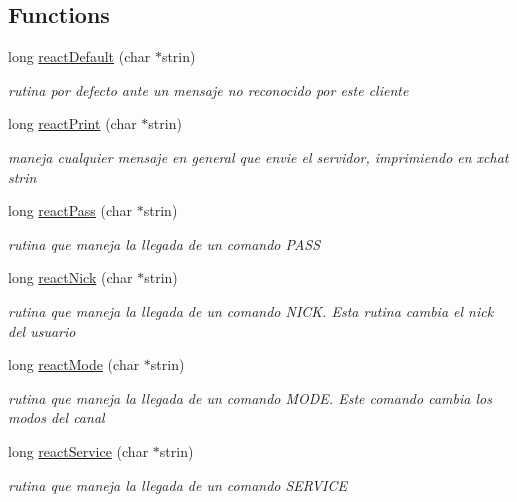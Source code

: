\subsection*{Functions}
\begin{DoxyCompactItemize}
\item 
long \hyperlink{_g-2301-05-_p2-basic_commands_from_server_8c_a4a541fbbe2af9ced94c42bd9035763e0}{react\-Default} (char $\ast$strin)
\begin{DoxyCompactList}\small\item\em rutina por defecto ante un mensaje no reconocido por este cliente \end{DoxyCompactList}\item 
long \hyperlink{_g-2301-05-_p2-basic_commands_from_server_8c_a44650743c7ba1a6a2768d4156028e8d4}{react\-Print} (char $\ast$strin)
\begin{DoxyCompactList}\small\item\em maneja cualquier mensaje en general que envie el servidor, imprimiendo en xchat strin \end{DoxyCompactList}\item 
long \hyperlink{_g-2301-05-_p2-basic_commands_from_server_8c_ac8c9483ef017ea056ed519d084029cff}{react\-Pass} (char $\ast$strin)
\begin{DoxyCompactList}\small\item\em rutina que maneja la llegada de un comando P\-A\-S\-S \end{DoxyCompactList}\item 
long \hyperlink{_g-2301-05-_p2-basic_commands_from_server_8c_af4a1c3e0adb16c333386f048f948a174}{react\-Nick} (char $\ast$strin)
\begin{DoxyCompactList}\small\item\em rutina que maneja la llegada de un comando N\-I\-C\-K. Esta rutina cambia el nick del usuario \end{DoxyCompactList}\item 
long \hyperlink{_g-2301-05-_p2-basic_commands_from_server_8c_a4c0608743d68b02dc2edaa0e113293df}{react\-Mode} (char $\ast$strin)
\begin{DoxyCompactList}\small\item\em rutina que maneja la llegada de un comando M\-O\-D\-E. Este comando cambia los modos del canal \end{DoxyCompactList}\item 
long \hyperlink{_g-2301-05-_p2-basic_commands_from_server_8c_a6aac8ec73a892579e8988ee16cee507c}{react\-Service} (char $\ast$strin)
\begin{DoxyCompactList}\small\item\em rutina que maneja la llegada de un comando S\-E\-R\-V\-I\-C\-E \end{DoxyCompactList}\item 

\end{DoxyCompactItemize}

